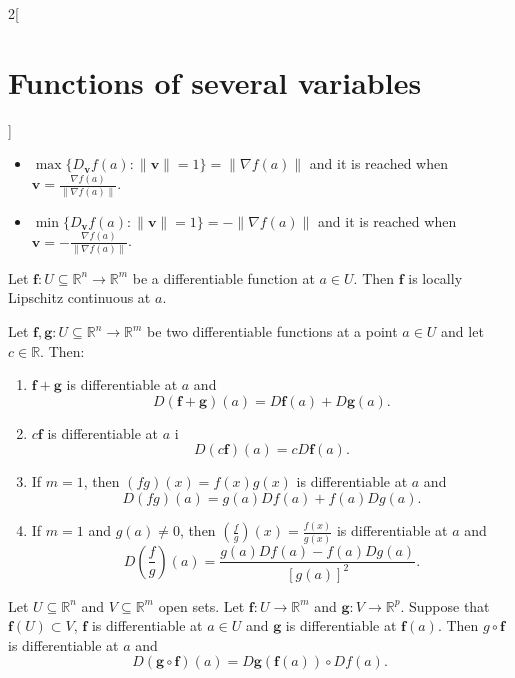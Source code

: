 \documentclass[class=article,10pt,crop=false]{standalone}
\begin{document}
\begin{multicols}{2}[\section{Functions of several variables}]
\begin{prop}
\begin{itemize}
    \item $\displaystyle\max\{D_\textbf{v}f(a):\|\textbf{v}\|=1\}=\|\nabla f(a)\|$ and it is reached when $\displaystyle \textbf{v}=\frac{\nabla f(a)}{\|\nabla f(a)\|}$.
    \item $\displaystyle\min\{D_\textbf{v}f(a):\|\textbf{v}\|=1\}=-\|\nabla f(a)\|$ and it is reached when $\displaystyle \textbf{v}=-\frac{\nabla f(a)}{\|\nabla f(a)\|}$.
\end{itemize}
\end{prop}
\begin{theorem}
Let $\boldsymbol{f}:U\subseteq\mathbb{R}^n\rightarrow\mathbb{R}^m$ be a differentiable function at $a\in U$. Then $\boldsymbol{f}$ is locally Lipschitz continuous at $a$.
\end{theorem}
\begin{theorem} 
Let $\boldsymbol{f},\boldsymbol{g}:U\subseteq\mathbb{R}^n\to\mathbb{R}^m$ be two differentiable functions at a point $a\in U$ and let $c\in\mathbb{R}$. Then:
\begin{enumerate}
    \item $\boldsymbol{f}+\boldsymbol{g}$ is differentiable at $a$ and $$D(\boldsymbol{f}+\boldsymbol{g})(a)=D\boldsymbol{f}(a)+D\boldsymbol{g}(a).$$
    \item $c\boldsymbol{f}$ is differentiable at $a$ i
    $$D(c\boldsymbol{f})(a)=cD\boldsymbol{f}(a).$$
    \item If $m=1$, then $(fg)(x)=f(x)g(x)$ is differentiable at $a$ and $$D(fg)(a)=g(a)Df(a)+f(a)Dg(a).$$
    \item If $m=1$ and $g(a)\ne0$, then $\displaystyle\left(\frac{f}{g}\right)(x)=\frac{f(x)}{g(x)}$ is differentiable at $a$ and $$D\left(\frac{f}{g}\right)(a)=\frac{g(a)Df(a)-f(a)Dg(a)}{[g(a)]^2}.$$
\end{enumerate}
\end{theorem}
\begin{theorem}
Let $U\subseteq\mathbb{R}^n$ and $V\subseteq\mathbb{R}^m$ open sets. Let $\boldsymbol{f}:U\rightarrow\mathbb{R}^m$ and $\boldsymbol{g}:V\rightarrow\mathbb{R}^p$. Suppose that $\boldsymbol{f}(U)\subset V$, $\boldsymbol{f}$ is differentiable at $a\in U$ and $\boldsymbol{g}$ is differentiable at $\boldsymbol{f}(a)$. Then $g\circ \boldsymbol{f}$ is differentiable at $a$ and $$D(\boldsymbol{g}\circ \boldsymbol{f})(a)=D\boldsymbol{g}(\boldsymbol{f}(a))\circ Df(a).$$
\end{theorem}
\begin{definition}

\end{definition}
\end{multicols}
\end{document}
